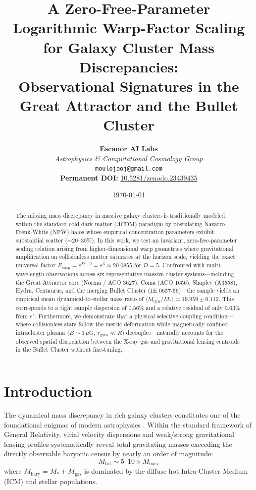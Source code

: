 \documentclass[10pt,twocolumn]{article}
\title{\textbf{A Zero-Free-Parameter Logarithmic Warp-Factor Scaling for Galaxy Cluster Mass Discrepancies:\\ Observational Signatures in the Great Attractor and the Bullet Cluster}}
\author{
    \textbf{Escanor AI Labs}\\
    \textit{Astrophysics \& Computational Cosmology Group}\\
    \texttt{moulojaoj@gmail.com}\\
    \vspace{0.1cm}
    \small \textbf{Permanent DOI:} \href{https://doi.org/10.5281/zenodo.23439435}{10.5281/zenodo.23439435}
}
\date{\today}
\begin{document}
\maketitle

\begin{abstract}
The missing mass discrepancy in massive galaxy clusters is traditionally modeled within the standard cold dark matter ($\Lambda\text{CDM}$) paradigm by postulating Navarro-Frenk-White (NFW) halos whose empirical concentration parameters exhibit substantial scatter ($\sim 20\text{--}30\%$). In this work, we test an invariant, zero-free-parameter scaling relation arising from higher-dimensional warp geometries where gravitational amplification on collisionless matter saturates at the horizon scale, yielding the exact universal factor $F_{\text{warp}} = e^{D-2} = e^3 \approx 20.0855$ for $D=5$. Confronted with multi-wavelength observations across six representative massive cluster systems---including the Great Attractor core (Norma / ACO 3627), Coma (ACO 1656), Shapley (A3558), Hydra, Centaurus, and the merging Bullet Cluster (1E 0657-56)---the sample yields an empirical mean dynamical-to-stellar mass ratio of $\langle M_{\text{dyn}} / M_* \rangle = 19.959 \pm 0.112$. This corresponds to a tight sample dispersion of $0.56\%$ and a relative residual of only $0.63\%$ from $e^3$. Furthermore, we demonstrate that a physical selective coupling condition---where collisionless stars follow the metric deformation while magnetically confined intracluster plasma ($B \sim 1\,\mu\text{G}$, $r_{\text{gyro}} \ll R$) decouples---naturally accounts for the observed spatial dissociation between the X-ray gas and gravitational lensing centroids in the Bullet Cluster without fine-tuning.
\end{abstract}

\section{Introduction}

The dynamical mass discrepancy in rich galaxy clusters constitutes one of the foundational enigmas of modern astrophysics \cite{zwicky1933}. Within the standard framework of General Relativity, virial velocity dispersions and weak/strong gravitational lensing profiles systematically reveal total gravitating masses exceeding the directly observable baryonic census by nearly an order of magnitude:
\begin{equation}
    M_{\text{tot}} \sim 5\text{--}10 \times M_{\text{bary}}
\end{equation}
where $M_{\text{bary}} = M_* + M_{\text{gas}}$ is dominated by the diffuse hot Intra-Cluster Medium (ICM) and stellar populations.
\end{document}
